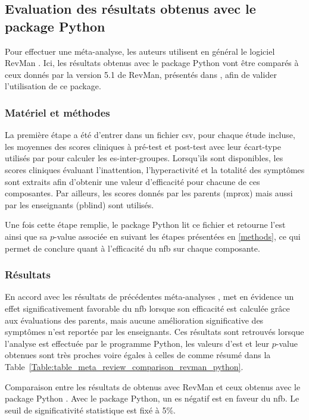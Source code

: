 \subsection{Evaluation des résultats obtenus avec le package Python} 

Pour effectuer une méta-analyse, les auteurs utilisent en général le logiciel RevMan \citep{Revman, Cortese2016, Micoulaud2014}. Ici, les résultats 
obtenus avec le package Python vont être comparés à ceux donnés par la version 5.1 de RevMan, présentés dans \citet{Cortese2016}, 
afin de valider l'utilisation de ce package.

\subsubsection{Matériel et méthodes}
La première étape a été d'entrer dans un fichier \gls{csv}, pour chaque étude incluse, les moyennes des scores cliniques à pré-test et post-test avec leur écart-type 
utilisés par \citet{Cortese2016} pour calculer les \gls{es}-inter-groupes. Lorsqu'ils sont disponibles, les scores cliniques évaluant l'inattention, l'hyperactivité 
et la totalité des symptômes sont extraits afin d'obtenir une valeur d'efficacité pour chacune de ces composantes. Par ailleurs, les scores donnés par les
parents (\gls{mprox}) mais aussi par les enseignants (\gls{pblind}) sont utilisés.

Une fois cette étape remplie, le package Python lit ce fichier et retourne l'\gls{est} ainsi que sa $p$-value associée en suivant les étapes présentées en
\ref{methods}, ce qui permet de conclure quant à l'efficacité du \gls{nfb} sur chaque composante.

\subsubsection{Résultats}
En accord avec les résultats de précédentes méta-analyses \citep{Sonuga-Barke2013, Micoulaud2014}, \citet{Cortese2016}
met en évidence un effet significativement favorable du \gls{nfb} lorsque son efficacité est calculée grâce aux évaluations des parents, mais aucune amélioration 
significative des symptômes n'est reportée par les enseignants. Ces résultats sont retrouvés lorsque l'analyse est effectuée par le programme Python, les valeurs
d'\gls{est} et leur $p$-value obtenues sont très proches voire égales à celles de \citet{Cortese2016} comme résumé dans la 
Table~\ref{Table:table_meta_review_comparison_revman_python}. 

\begin{table}[h!]
  \centering
  \caption[Comparaison entre les résultats de \citet{Cortese2016} obtenus avec RevMan \citep{Revman} et ceux obtenus avec le package Python.]{Comparaison entre les résultats de \citet{Cortese2016} obtenus avec RevMan \citep{Revman} et ceux obtenus avec le package Python \citep{Bussalb2019clinical}.
	Avec le package Python, un \gls{es} négatif est en faveur du \gls{nfb}. Le seuil de significativité statistique est fixé à 5\%.}
  
  \label{Table:table_meta_review_comparison_revman_python}
\end{table}


